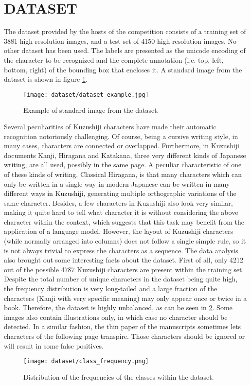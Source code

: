 \section{DATASET}
\label{sec:dataset}

The dataset provided by the hosts of the competition consists of a training set of 3881 high-resolution images, and a test set of 4150 high-resolution images. No other dataset  has been used. The labels are presented as the unicode encoding of the character to be recognized and the complete annotation (i.e. top, left, bottom, right) of the bounding box that encloses it. A standard image from the dataset is shown in figure \ref{fig:dataset_example}. \\

\begin{figure}[h]
	\caption{Example of standard image from the dataset.}
	\centering
	\texttt{[image: dataset/dataset\_example.jpg]}
	\label{fig:dataset_example}
\end{figure}

Several peculiarities of Kuzushiji characters have made their automatic recognition notoriously challenging. Of course, being a cursive writing style, in many cases, characters are connected or overlapped. Furthermore, in Kuzushiji documents Kanji, Hiragana and Katakana, three very different kinds of Japanese writing, are all used, possibly in the same page. A peculiar characteristic of one of these kinds of writing, Classical Hiragana, is that many characters which can only be written in a single way in modern Japanese can be written in many different ways in Kuzushiji, generating multiple orthographic variations of the same character. Besides, a few characters in Kuzushiji also look very similar, making it quite hard to tell what character it is without considering the above character within the context, which suggests that this task may benefit from the application of a language model. However, the layout of Kuzushiji characters (while normally arranged into columns) does not follow a single simple rule, so it is not always trivial to express the characters as a sequence. The data analysis also brought out some interesting facts about the dataset. First of all, only 4212 out of the possible 4787 Kuzushiji characters are present within the training set. Despite the total number of unique characters in the dataset being quite high, the frequency distribution is very long-tailed and a large fraction of the characters (Kanji with very specific meaning) may only appear once or twice in a book. Therefore, the dataset is highly unbalanced, as can be seen in \ref{fig:class-frequency}. Some images also contain illustrations only, in which case no character should be detected. In a similar fashion, the thin paper of the manuscripts sometimes lets characters of the following page transpire. Those characters should be ignored or will result in some false positives.


\begin{figure}[h]
	\caption{Distribution of the frequencies of the classes within the dataset.}
	\centering
	\texttt{[image: dataset/class\_frequency.png]}
	\label{fig:class-frequency}
\end{figure}
